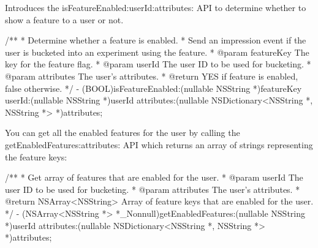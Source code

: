 \begin{DoxyItemize}
\item Introduces the {\ttfamily is\+Feature\+Enabled\+:user\+Id\+:attributes\+:} A\+PI to determine whether to show a feature to a user or not. 
\begin{DoxyCode}
/**
 * Determine whether a feature is enabled.
 * Send an impression event if the user is bucketed into an experiment using the feature.
 * @param featureKey The key for the feature flag.
 * @param userId The user ID to be used for bucketing.
 * @param attributes The user's attributes.
 * @return YES if feature is enabled, false otherwise.
 */
- (BOOL)isFeatureEnabled:(nullable NSString *)featureKey userId:(nullable NSString *)userId
       attributes:(nullable NSDictionary<NSString *, NSString *> *)attributes;
\end{DoxyCode}

\item You can get all the enabled features for the user by calling the {\ttfamily get\+Enabled\+Features\+:attributes\+:} A\+PI which returns an array of strings representing the feature keys\+: 
\begin{DoxyCode}
/**
 * Get array of features that are enabled for the user.
 * @param userId The user ID to be used for bucketing.
 * @param attributes The user's attributes.
 * @return NSArray<NSString> Array of feature keys that are enabled for the user.
 */
- (NSArray<NSString *> *\_Nonnull)getEnabledFeatures:(nullable NSString *)userId
                                         attributes:(nullable NSDictionary<NSString *, NSString *>
       *)attributes;
\end{DoxyCode}


\end{DoxyItemize}
